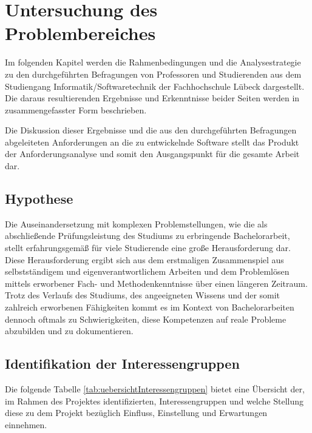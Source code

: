 \documentclass[bibliography=totoc,listof=totoc,BCOR=5mm,DIV=12,oneside]{scrbook}
\begin{document}
\newpage
\chapter{Untersuchung des Problembereiches} \label{chap:problemanalyse}
\par Im folgenden Kapitel werden die Rahmenbedingungen und die Analysestrategie zu den durchgeführten Befragungen von Professoren und Studierenden aus dem Studiengang Informatik/Softwaretechnik der Fachhochschule Lübeck dargestellt. Die daraus resultierenden Ergebnisse und Erkenntnisse beider Seiten werden in zusammengefasster Form beschrieben. 
\par Die Diskussion dieser Ergebnisse und die aus den durchgeführten Befragungen abgeleiteten Anforderungen an die zu entwickelnde Software stellt das Produkt der Anforderungsanalyse und somit den Ausgangspunkt für die gesamte Arbeit dar.

\section{Hypothese}
\par Die Auseinandersetzung mit komplexen Problemstellungen, wie die als abschließende Prüfungsleistung des Studiums zu erbringende Bachelorarbeit, stellt erfahrungsgemäß für viele Studierende eine große Herausforderung dar. Diese Herausforderung ergibt sich aus dem erstmaligen Zusammenspiel aus selbstständigem und eigenverantwortlichem Arbeiten und dem Problemlösen mittels erworbener Fach- und Methodenkenntnisse über einen längeren Zeitraum.
Trotz des Verlaufs des Studiums, des angeeigneten Wissens und der somit zahlreich erworbenen Fähigkeiten kommt es im Kontext von Bachelorarbeiten dennoch oftmals zu Schwierigkeiten, diese Kompetenzen auf reale Probleme abzubilden und zu dokumentieren.

\newpage
\section{Identifikation der Interessengruppen}
\par Die folgende Tabelle \ref{tab:uebersichtInteressengruppen} bietet eine Übersicht der, im Rahmen des Projektes identifizierten, Interessengruppen und welche Stellung diese zu dem Projekt bezüglich Einfluss, Einstellung und Erwartungen einnehmen.
\end{document}
